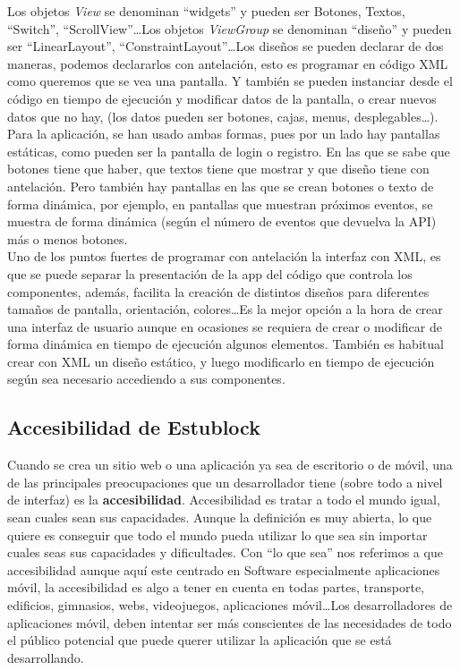 Los objetos \emph{View} se denominan ``widgets'' y pueden ser Botones, Textos, ``Switch'', ``ScrollView''\dots Los objetos \emph{ViewGroup} se denominan ``diseño'' y pueden ser ``LinearLayout'', ``ConstraintLayout''\dots Los diseños se pueden declarar de dos maneras, podemos declararlos con antelación, esto es programar en código XML como queremos que se vea una pantalla. Y también se pueden instanciar desde el código en tiempo de ejecución y modificar datos de la pantalla, o crear nuevos datos que no hay, (los datos pueden ser botones, cajas, menus, desplegables\dots). \\

Para la aplicación, se han usado ambas formas, pues por un lado hay pantallas estáticas, como pueden ser la pantalla de login o registro. En las que se sabe que botones tiene que haber, que textos tiene que mostrar y que diseño tiene con antelación. Pero también hay pantallas en las que se crean botones o texto de forma dinámica, por ejemplo, en pantallas que muestran próximos eventos, se muestra de forma dinámica (según el número de eventos que devuelva la API) más o menos botones. \\

Uno de los puntos fuertes de programar con antelación la interfaz con XML, es que se puede separar la presentación de la app del código que controla los componentes, además, facilita la creación de distintos diseños para diferentes tamaños de pantalla, orientación, colores\dots Es la mejor opción a la hora de crear una interfaz de usuario aunque en ocasiones se requiera de crear o modificar de forma dinámica en tiempo de ejecución algunos elementos. También es habitual crear con XML un diseño estático, y luego modificarlo en tiempo de ejecución según sea necesario accediendo a sus componentes.  


\subsection{Accesibilidad de Estublock}

Cuando se crea un sitio web o una aplicación ya sea de escritorio o de móvil, una de las principales preocupaciones que un desarrollador tiene (sobre todo a nivel de interfaz) es la \textbf{accesibilidad}. Accesibilidad es tratar a todo el mundo igual, sean cuales sean sus capacidades. Aunque la definición es muy abierta, lo que quiere es conseguir que todo el mundo pueda utilizar lo que sea sin importar cuales seas sus capacidades y dificultades. Con ``lo que sea'' nos referimos a que accesibilidad aunque aquí este centrado en Software especialmente aplicaciones móvil, la accesibilidad es algo a tener en cuenta en todas partes, transporte, edificios, gimnasios, webs, videojuegos, aplicaciones móvil\dots Los desarrolladores de aplicaciones móvil, deben intentar ser más conscientes de las necesidades de todo el público potencial que puede querer utilizar la aplicación que se está desarrollando. \\

